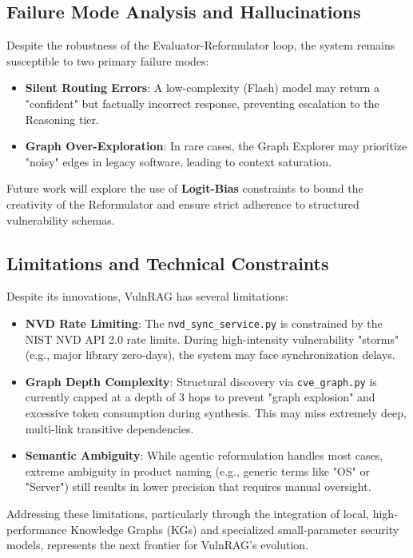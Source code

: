 \subsection{Failure Mode Analysis and Hallucinations}
Despite the robustness of the Evaluator-Reformulator loop, the system remains susceptible to two primary failure modes:
\begin{itemize}
    \item \textbf{Silent Routing Errors}: A low-complexity (Flash) model may return a "confident" but factually incorrect response, preventing escalation to the Reasoning tier.
    \item \textbf{Graph Over-Exploration}: In rare cases, the Graph Explorer may prioritize "noisy" edges in legacy software, leading to context saturation. 
\end{itemize}
Future work will explore the use of \textbf{Logit-Bias} constraints to bound the creativity of the Reformulator and ensure strict adherence to structured vulnerability schemas.

\subsection{Limitations and Technical Constraints}
Despite its innovations, VulnRAG has several limitations:
\begin{itemize}
    \item \textbf{NVD Rate Limiting}: The \texttt{nvd\_sync\_service.py} is constrained by the NIST NVD API 2.0 rate limits. During high-intensity vulnerability "storms" (e.g., major library zero-days), the system may face synchronization delays.
    \item \textbf{Graph Depth Complexity}: Structural discovery via \texttt{cve\_graph.py} is currently capped at a depth of 3 hops to prevent "graph explosion" and excessive token consumption during synthesis. This may miss extremely deep, multi-link transitive dependencies.
    \item \textbf{Semantic Ambiguity}: While agentic reformulation handles most cases, extreme ambiguity in product naming (e.g., generic terms like "OS" or "Server") still results in lower precision that requires manual oversight.
\end{itemize}

Addressing these limitations, particularly through the integration of local, high-performance Knowledge Graphs (KGs) and specialized small-parameter security models, represents the next frontier for VulnRAG’s evolution.
